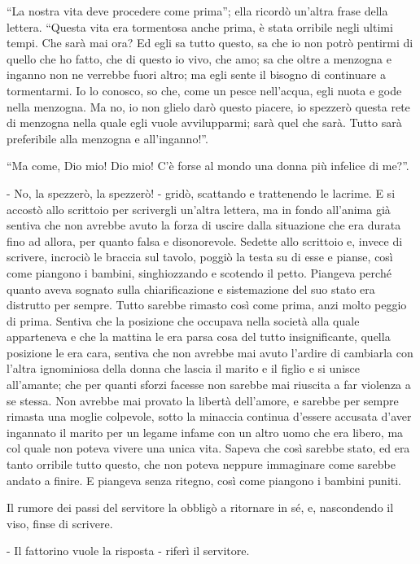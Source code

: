 ``La nostra vita deve procedere come prima''; ella ricordò un'altra frase della lettera. ``Questa vita era tormentosa anche prima, è stata orribile negli ultimi tempi. Che sarà mai ora? Ed egli sa tutto questo, sa che io non potrò pentirmi di quello che ho fatto, che di questo io vivo, che amo; sa che oltre a menzogna e inganno non ne verrebbe fuori altro; ma egli sente il bisogno di continuare a tormentarmi. Io lo conosco, so che, come un pesce nell'acqua, egli nuota e gode nella menzogna. Ma no, io non glielo darò questo piacere, io spezzerò questa rete di menzogna nella quale egli vuole avvilupparmi; sarà quel che sarà. Tutto sarà preferibile alla menzogna e all'inganno!''. 

``Ma come, Dio mio! Dio mio! C'è forse al mondo una donna più infelice di me?''. 

- No, la spezzerò, la spezzerò! - gridò, scattando e trattenendo le lacrime. E si accostò allo scrittoio per scrivergli un'altra lettera, ma in fondo all'anima già sentiva che non avrebbe avuto la forza di uscire dalla situazione che era durata fino ad allora, per quanto falsa e disonorevole. Sedette allo scrittoio e, invece di scrivere, incrociò le braccia sul tavolo, poggiò la testa su di esse e pianse, così come piangono i bambini, singhiozzando e scotendo il petto. Piangeva perché quanto aveva sognato sulla chiarificazione e sistemazione del suo stato era distrutto per sempre. Tutto sarebbe rimasto così come prima, anzi molto peggio di prima. Sentiva che la posizione che occupava nella società alla quale apparteneva e che la mattina le era parsa cosa del tutto insignificante, quella posizione le era cara, sentiva che non avrebbe mai avuto l'ardire di cambiarla con l'altra ignominiosa della donna che lascia il marito e il figlio e si unisce all'amante; che per quanti sforzi facesse non sarebbe mai riuscita a far violenza a se stessa. Non avrebbe mai provato la libertà dell'amore, e sarebbe per sempre rimasta una moglie colpevole, sotto la minaccia continua d'essere accusata d'aver ingannato il marito per un legame infame con un altro uomo che era libero, ma col quale non poteva vivere una unica vita. Sapeva che così sarebbe stato, ed era tanto orribile tutto questo, che non poteva neppure immaginare come sarebbe andato a finire. E piangeva senza ritegno, così come piangono i bambini puniti. 

Il rumore dei passi del servitore la obbligò a ritornare in sé, e, nascondendo il viso, finse di scrivere. 

- Il fattorino vuole la risposta - riferì il servitore. 

